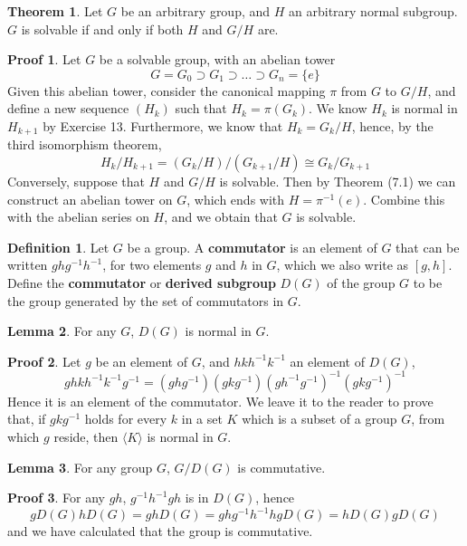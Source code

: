 \documentclass[12pt]{amsbook}
\theoremstyle{definition}
\newtheorem{theorem}{Theorem}[chapter]
\newtheorem{lemma}[theorem]{Lemma}
\newtheorem{definition}{Definition}
\newtheorem*{prf}{Proof}
\newcommand{\gen}[1]{\langle #1 \rangle} %
\begin{document}
\begin{theorem}
    Let $G$ be an arbitrary group, and $H$ an arbitrary normal subgroup. $G$ is solvable if and only if both $H$ and $G/H$ are.
\end{theorem}
\begin{prf}
    Let $G$ be a solvable group, with an abelian tower
    \[ G = G_0 \supset G_1 \supset \dots \supset G_n = \{ e \} \]
    Given this abelian tower, consider the canonical mapping $\pi$ from $G$ to $G/H$, and define a new sequence $(H_k)$ such that $H_k = \pi(G_k)$. We know $H_k$ is normal in $H_{k+1}$ by Exercise 13. Furthermore, we know that $H_k = G_k/H$, hence, by the third isomorphism theorem,
    \[ H_k/H_{k+1} = (G_k/H)/(G_{k+1}/H) \cong G_k/G_{k+1} \]
    Conversely, suppose that $H$ and $G/H$ is solvable. Then by Theorem (7.1) we can construct an abelian tower on $G$, which ends with $H = \pi^{-1}(e)$. Combine this with the abelian series on $H$, and we obtain that $G$ is solvable.
\end{prf}

\begin{definition}
    Let $G$ be a group. A {\bf commutator} is an element of $G$ that can be written $ghg^{-1}h^{-1}$, for two elements $g$ and $h$ in $G$, which we also write as $[g,h]$. Define the {\bf commutator} or {\bf derived subgroup} $D(G)$ of the group $G$ to be the group generated by the set of commutators in $G$.
\end{definition}

\begin{lemma}
    For any $G$, $D(G)$ is normal in $G$.
\end{lemma}
\begin{prf}
    Let $g$ be an element of $G$, and $hkh^{-1}k^{-1}$ an element of $D(G)$,
    \[ ghkh^{-1}k^{-1}g^{-1} = (ghg^{-1})(gkg^{-1})(gh^{-1}g^{-1})^{-1}(gkg^{-1})^{-1} \]
    Hence it is an element of the commutator. We leave it to the reader to prove that, if $gkg^{-1}$ holds for every $k$ in a set $K$ which is a subset of a group $G$, from which $g$ reside, then $\gen{K}$ is normal in $G$.
\end{prf}

\begin{lemma}
    For any group $G$, $G/D(G)$ is commutative.
\end{lemma}
\begin{prf}
    For any $gh$, $g^{-1}h^{-1}gh$ is in $D(G)$, hence
    \[ gD(G)hD(G) = ghD(G) = ghg^{-1}h^{-1}hgD(G) = hD(G)gD(G) \]
    and we have calculated that the group is commutative.
\end{prf}
\end{document}
